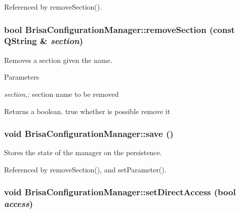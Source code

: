 Referenced by removeSection().\hypertarget{classBrisaCore_1_1BrisaConfigurationManager_a99863f30d930844f274e48d0ac289791}{
\subsubsection[{removeSection}]{\setlength{\rightskip}{0pt plus 5cm}bool BrisaConfigurationManager::removeSection (const QString \& {\em section})}}
\label{classBrisaCore_1_1BrisaConfigurationManager_a99863f30d930844f274e48d0ac289791}


Removes a section given the name. 
\begin{DoxyParams}{Parameters}
\item[{\em section,:}]section name to be removed \end{DoxyParams}
\begin{DoxyReturn}{Returns}
a boolean. true whether is possible remove it 
\end{DoxyReturn}
\hypertarget{classBrisaCore_1_1BrisaConfigurationManager_a3da3cd7739a19d536d763cef39d8adfa}{
\subsubsection[{save}]{\setlength{\rightskip}{0pt plus 5cm}void BrisaConfigurationManager::save ()}}
\label{classBrisaCore_1_1BrisaConfigurationManager_a3da3cd7739a19d536d763cef39d8adfa}


Stores the state of the manager on the persistence. 

Referenced by removeSection(), and setParameter().\hypertarget{classBrisaCore_1_1BrisaConfigurationManager_add1eabc42cefd0aa066222a60b70df71}{
\subsubsection[{setDirectAccess}]{\setlength{\rightskip}{0pt plus 5cm}void BrisaConfigurationManager::setDirectAccess (bool {\em access})}}
\label{classBrisaCore_1_1BrisaConfigurationManager_add1eabc42cefd0aa066222a60b70df71}


